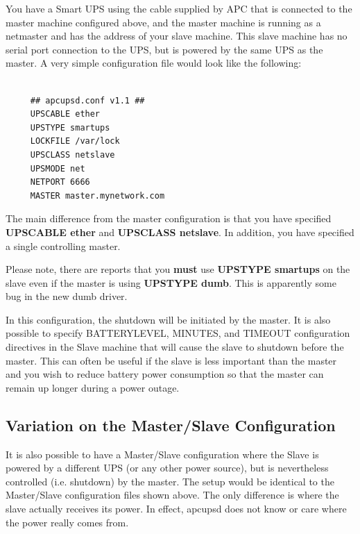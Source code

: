 \label{index-Slave-Configuration-77}
\label{index-Configuration_002c-Slave-78}
\label{index-Example_002c-Slave-conf-79}
You have a Smart UPS using the cable supplied by APC that is connected to the
master machine configured above, and the master machine is running as a
netmaster and has the address of your slave machine.  This slave machine has
no serial port connection to the UPS, but is powered by the same UPS as the
master.  A very simple configuration file would look like the following: 

\footnotesize
\begin{verbatim}
     
     ## apcupsd.conf v1.1 ##
     UPSCABLE ether
     UPSTYPE smartups
     LOCKFILE /var/lock
     UPSCLASS netslave
     UPSMODE net
     NETPORT 6666
     MASTER master.mynetwork.com
\end{verbatim}
\normalsize

The main difference from the master configuration is that you have specified
{\bf UPSCABLE ether} and {\bf UPSCLASS netslave}.  In addition, you have
specified a single controlling master.  

Please note, there are reports that you {\bf must} use {\bf UPSTYPE smartups}
on the slave even if the master is using {\bf UPSTYPE dumb}. This is
apparently some bug in the new dumb driver.  

In this configuration, the shutdown will be initiated by the master. It is
also possible to specify BATTERYLEVEL, MINUTES, and TIMEOUT configuration
directives in the Slave machine that will cause the slave to shutdown before
the master. This can often be useful if the slave is less important than the
master and you wish to reduce battery power consumption so that the master can
remain up longer during a power outage. 

\label{Variation-on-the-Master_002fSlave-Configuration}

\subsection*{Variation on the Master/Slave Configuration}

\label{index-Master_002fSlave-variation-80}
It is also possible to have a Master/Slave configuration where the Slave is
powered by a different UPS (or any other power source), but is nevertheless
controlled (i.e.  shutdown) by the master.  The setup would be identical to
the Master/Slave configuration files shown above.  The only difference is
where the slave actually receives its power.  In effect, apcupsd does not know
or care where the power really comes from. 

